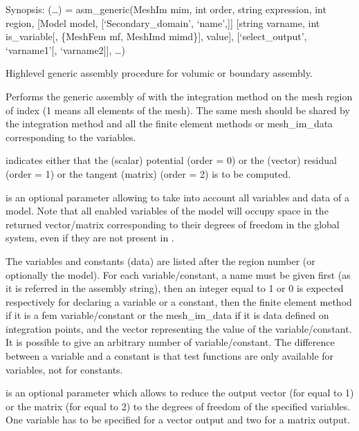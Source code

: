\documentclass[a4paper,11pt,english]{sphinxmanual}
\begin{document}
\begin{fulllineitems}
\label{\detokenize{python/cmdref_Module asm:getfem.asm_generic}}
Synopsis: (…) = asm\_generic(MeshIm mim, int order, string expression, int region, {[}Model model, {[}‘Secondary\_domain’, ‘name’,{]}{]} {[}string varname, int is\_variable{[}, \{MeshFem mf, MeshImd mimd\}{]}, value{]}, {[}‘select\_output’, ‘varname1’{[}, ‘varname2{]}{]}, …)

High\sphinxhyphen{}level generic assembly procedure for volumic or boundary assembly.

Performs the generic assembly of  with the integration
method  on the mesh region of index  (\sphinxhyphen{}1 means all
elements of the mesh). The same mesh should be shared by
the integration method and all the finite element methods or
mesh\_im\_data corresponding to the variables.

 indicates either that the (scalar) potential
(order = 0) or the (vector) residual (order = 1) or the
tangent (matrix) (order = 2) is to be computed.

 is an optional parameter allowing to take into account
all variables and data of a model. Note that all enabled variables
of the model will occupy space in the returned vector/matrix
corresponding to their degrees of freedom in the global system, even
if they are not present in .

The variables and constants (data) are listed after the region number
(or optionally the model).
For each variable/constant, a name must be given first (as it is
referred in the assembly string), then an integer equal to 1 or 0
is expected respectively for declaring a variable or a constant,
then the finite element method if it is a fem variable/constant or
the mesh\_im\_data if it is data defined on integration points, and
the vector representing the value of the variable/constant.
It is possible to give an arbitrary number of variable/constant.
The difference between a variable and a constant is that test
functions are only available for variables, not for constants.

 is an optional parameter which allows to reduce the
output vector (for  equal to 1) or the matrix (for 
equal to 2) to the degrees of freedom of the specified variables.
One variable has to be specified for a vector output and two for a
matrix output.


\end{fulllineitems}
\end{document}
